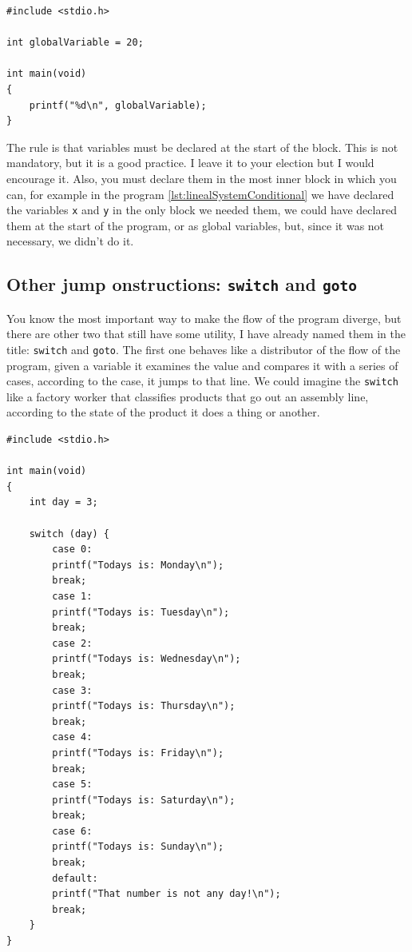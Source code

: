 \documentclass[a4paper]{article}
\begin{document}
\noindent
\begin{minipage}[H]{\linewidth}
\mbox{}
\begin{lstlisting}[style=C,
caption={Example of a program with a global variable},
label={lst:globalVar}]
#include <stdio.h>

int globalVariable = 20;

int main(void)
{
    printf("%d\n", globalVariable);
}
\end{lstlisting}
\end{minipage}

The rule is that variables must be declared at the start of the block. This is
not mandatory, but it is a good practice. I leave it to your election but I
would encourage it.
Also, you must declare them in the most inner block in which you can, for
example in the program \ref{lst:linealSystemConditional} we have declared
the variables \texttt{x} and \texttt{y} in the only block we needed them, we
could have declared them at the start of the program, or as global variables,
but, since it was not necessary, we didn't do it.

\subsection{Other jump onstructions: \texttt{switch} and \texttt{goto}}
You know the most important way to make the flow of the program diverge, but
there are other two that still have some utility, I have already named them in
the title: \texttt{switch} and \texttt{goto}. The first one behaves like a
distributor of the flow of the program, given a variable it examines the value
and compares it with a series of cases, according to the case, it jumps to that
line. We could imagine the \texttt{switch} like a factory worker that classifies
products that go out an assembly line, according to the state of the product it
does a thing or another.

\noindent
\begin{minipage}[H]{\linewidth}
\mbox{}
\begin{lstlisting}[style=C,
caption={Example of a program with a \texttt{switch}},
label={lst:switchExample}]
#include <stdio.h>

int main(void)
{
    int day = 3;

    switch (day) {
        case 0:
        printf("Todays is: Monday\n");
        break;
        case 1:
        printf("Todays is: Tuesday\n");
        break;
        case 2:
        printf("Todays is: Wednesday\n");
        break;
        case 3:
        printf("Todays is: Thursday\n");
        break;
        case 4:
        printf("Todays is: Friday\n");
        break;
        case 5:
        printf("Todays is: Saturday\n");
        break;
        case 6:
        printf("Todays is: Sunday\n");
        break;
        default:
        printf("That number is not any day!\n");
        break;
    }
}
\end{lstlisting}
\end{minipage}
\end{document}
